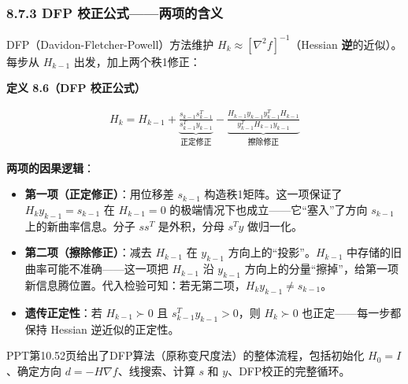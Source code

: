 \subsubsection{8.7.3 DFP 校正公式——两项的含义}

DFP（Davidon-Fletcher-Powell）方法维护 $H_k \approx [\nabla^2 f]^{-1}$（Hessian \textbf{逆}的近似）。每步从 $H_{k-1}$ 出发，加上两个秩1修正：

\begin{defbox}
\textbf{定义 8.6（DFP 校正公式）}

\begin{multline*}
H_k = H_{k-1}
      + \underbrace{\frac{s_{k-1} s_{k-1}^T}{s_{k-1}^T y_{k-1}}}_{\text{正定修正}}
      - \underbrace{\frac{H_{k-1} y_{k-1} y_{k-1}^T H_{k-1}}{y_{k-1}^T H_{k-1} y_{k-1}}}_{\text{擦除修正}}
\end{multline*}

\textbf{两项的因果逻辑}：
\begin{itemize}
  \item \textbf{第一项（正定修正）}：用位移差 $s_{k-1}$ 构造秩1矩阵。这一项保证了 $H_k y_{k-1} = s_{k-1}$ 在 $H_{k-1}=0$ 的极端情况下也成立——它``塞入''了方向 $s_{k-1}$ 上的新曲率信息。分子 $ss^T$ 是外积，分母 $s^Ty$ 做归一化。
  \item \textbf{第二项（擦除修正）}：减去 $H_{k-1}$ 在 $y_{k-1}$ 方向上的``投影''。$H_{k-1}$ 中存储的旧曲率可能不准确——这一项把 $H_{k-1}$ 沿 $y_{k-1}$ 方向上的分量``擦掉''，给第一项新信息腾位置。代入检验可知：若无第二项，$H_k y_{k-1} \neq s_{k-1}$。
  \item \textbf{遗传正定性}：若 $H_{k-1} \succ 0$ 且 $s_{k-1}^T y_{k-1} > 0$，则 $H_k \succ 0$ 也正定——每一步都保持 Hessian 逆近似的正定性。
\end{itemize}
\end{defbox}

PPT第10.52页给出了DFP算法（原称变尺度法）的整体流程，包括初始化 $H_0 = I$、确定方向 $d = -H\nabla f$、线搜索、计算 $s$ 和 $y$、DFP校正的完整循环。

\smallskip
{}
\smallskip
{}
\medskip

